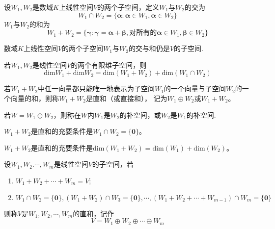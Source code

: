     \begin{definition}[子空间的交与和]
        设$W_1,W_2$是数域$K$上线性空间$V$的两个子空间，定义$W_1$与$W_2$的交为
        $$W_1\cap W_2=\{\boldsymbol{\alpha}:\boldsymbol{\alpha}\in W_1,\boldsymbol{\alpha}\in W_2\}$$
        $W_1$与$W_2$的和为
        $$W_1+W_2=\{\boldsymbol{\gamma}:\boldsymbol{\gamma}=\boldsymbol{\alpha}+\boldsymbol{\beta},\mbox{对所有的}\boldsymbol{\alpha}\in W_1,\boldsymbol{\beta}\in W_2\}$$
    \end{definition}

    \begin{theorem}
        数域$K$上线性空间$V$的两个子空间$W_1$与$W_2$的交与和仍是$V$的子空间.
    \end{theorem}

    \begin{theorem}
        若$W_1,W_2$是线性空间$V$的两个有限维子空间，则
        $$\mathrm{dim}W_1+\mathrm{dim}W_2=\mathrm{dim}(W_1+W_2)+\mathrm{dim}(W_1\cap W_2)$$
    \end{theorem}

    \begin{definition}[直和]
        若$W_1+W_2$中任一向量都只能唯一地表示为子空间$W_1$的一个向量与子空间$W_2$的一个向量的和，则称$W_1+W_2$是{\heiti 直和}（或{\heiti 直接和}），
        记为$W_1\oplus W_2$或$W_1+W_2$。
        
        若$W=W_1\oplus W_2$，则称在$W$内$W_1$是$W_2$的{\heiti 补空间}，或$W_2$是$W_1$的{\heiti 补空间}.
    \end{definition}

    \begin{theorem}
        $W_1+W_2$是直和的充要条件是$W_1\cap W_2=\{\boldsymbol{0}\}$。
    \end{theorem}

    \begin{theorem}
        $W_1+W_2$是直和的充要条件是$\mathrm{dim}(W_1+ W_2)=\mathrm{dim}(W_1)+\mathrm{dim}(W_2)$。
    \end{theorem}

    \begin{definition}
        设$W_1,W_2.\cdots,W_m$是线性空间$V$的子空间，若
        \begin{enumerate}[(1)]
            \item $W_1+W_2+\cdots+W_m=V$;
            \item $W_1\cap W_2=\{\boldsymbol{0}\},(W_1+W_2)\cap W_3=\{\boldsymbol{0}\},\cdots,(W_1+W_2+\cdots+W_{m-1})\cap W_m=\{\boldsymbol{0}\}$
        \end{enumerate}
        则称$V$是$W_1,W_2,\cdots,W_m$的直和，记作
        $$V=W_1\oplus W_2\oplus \cdots \oplus W_m$$
    \end{definition}


